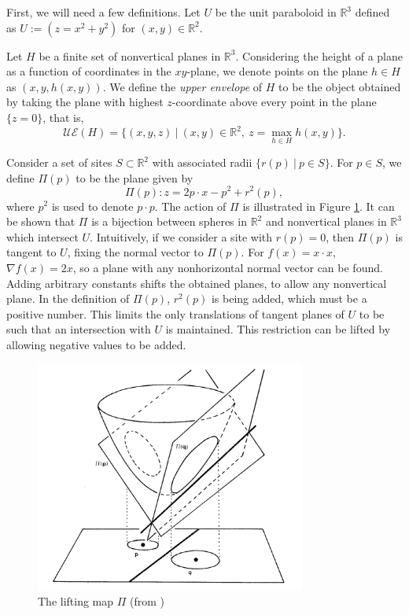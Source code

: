 \documentclass[a4paper, 11pt]{article}
\newcommand{\R}{\mathbb{R}}
\begin{document}
First, we will need a few definitions. Let $U$ be the unit paraboloid in $\R^3$ defined as $U := (z = x^2 + y^2)$ for $(x,y) \in \R^2$.

Let $H$ be a finite set of nonvertical planes in $\R^3$. Considering the height of a plane as a function of coordinates in the $xy$-plane, we denote points
on the plane $h \in H$ as $(x,y,h(x,y))$. We define the \textit{upper envelope} of $H$ to be the object obtained by taking the plane with highest
$z$-coordinate above every point in the plane $\{ z = 0 \}$, that is,
\[ \mathcal{UE}(H) = \{ (x,y,z) \ | \ (x,y) \in \R^2, \ z = \max_{h \in H} h(x,y) \} .\]

Consider a set of sites $S \subset \R^2$ with associated radii $\{r(p) \ | \ p \in S\}$. For $p \in S$, we define $\Pi(p)$ to be the plane given by
\[ \Pi(p) : z = 2 p \cdot x - p^2 + r^2(p) ,\]
where $p^2$ is used to denote $p \cdot p$. The action of $\Pi$ is illustrated in Figure \ref{fig:lift}. It can be shown that $\Pi$ is a bijection between spheres in $\R^2$ and nonvertical planes in $\R^3$ which
intersect $U$. Intuitively, if we consider a site with $r(p) = 0$, then $\Pi(p)$ is tangent to $U$, fixing the normal vector to $\Pi(p)$. For $f(x) =
x \cdot x$, $\nabla f(x) = 2x$, so a plane with any nonhorizontal normal vector can be found. Adding arbitrary constants shifts the obtained planes, to allow any
nonvertical plane. In the definition of $\Pi(p)$, $r^2(p)$ is being added, which must be a positive number. This limits the only translations of
tangent planes of $U$ to be such that an intersection with $U$ is maintained. This restriction can be lifted by allowing negative values to be added.

\begin{figure}[h]
  \centering
  \includegraphics[height=3in]{lifting(aur_surv).png}
  \caption{The lifting map $\Pi$ (from \cite{aurenhammer_survey})}
  \label{fig:lift}
\end{figure}
\end{document}
